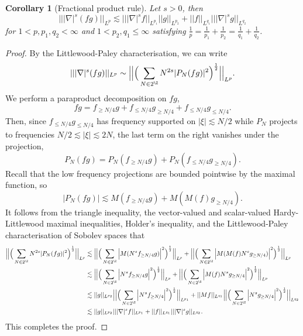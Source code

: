 \documentclass[reqno]{amsart}
\newtheorem{corollary}[theorem]{Corollary}
\theoremstyle{definition}
\theoremstyle{remark}
\begin{document}
\begin{corollary}[Fractional product rule]
	Let $s > 0$, then 
		\[ |||\nabla|^s (fg) ||_{L^p} \lesssim |||\nabla|^s f||_{L^{p_1}} ||g||_{L^{p_2}} + ||f||_{L^{q_1}} |||\nabla|^s g||_{L^{q_2}} \]
	for $1 < p, p_1, q_2 < \infty$ and $1 < p_2, q_1 \leq \infty$ satisfying $\tfrac1p = \tfrac{1}{p_1} + \tfrac{1}{p_2} = \tfrac{1}{q_1} + \tfrac{1}{q_2}$. 	
\end{corollary}

\begin{proof}
	By the Littlewood-Paley characterisation, we can write
		\[ || |\nabla|^s (f g) ||_{L^p} \sim \Big| \Big| \Big( \sum_{N \in 2^\Z} N^{2s} |P_N (f g)|^2 \Big)^\frac12 \Big| \Big|_{L^p}. \]
	We perform a paraproduct decomposition on $fg$, 
		\[ fg = f_{\geq N/4} g + f_{\leq N/4} g_{\geq N/4} + f_{\leq N/4} g_{\leq N/4}. \]
	Then, since $f_{\leq N/4} g_{\leq N/4}$ has frequency supported on $|\xi| \lesssim N/2$ while $P_N$ projects to frequencies $N/2 \lesssim |\xi| \lesssim 2N$, the last term on the right vanishes under the projection, 
		\[ P_N (f g) =  P_N (f_{\geq N/4} g) +P_N( f_{\leq N/4} g_{\geq N/4}) .  \]
	Recall that the low frequency projections are bounded pointwise by the maximal function, so 
		\[ |P_N (fg)| \lesssim M(f_{\geq N/4} g) + M(M(f) g_{\geq N/4}). \]
	It follows from the triangle inequality, the vector-valued and scalar-valued Hardy-Littlewood maximal inequalities, Holder's inequality, and the Littlewood-Paley characterisation of Sobolev spaces that
		\begin{align*}
			\Big|\Big| \Big( \sum_{N \in 2^\Z} N^{2s} |P_N (fg)|^2\Big)^\frac12 \Big|\Big|_{L^p} 
				&\lesssim \Big| \Big| \Big( \sum_{N \in 2^\Z} \Big| M(N^s f_{\geq N/4} g) \Big|^2 \Big)^\frac12 \Big| \Big|_{L^p} +  \Big| \Big| \Big( \sum_{N \in 2^\Z} \Big| M(M(f) N^s g_{\geq N/4}) \Big|^2 \Big)^\frac12 \Big| \Big|_{L^p} \\
				&\lesssim \Big| \Big| \Big( \sum_{N \in 2^\Z} \Big| N^s f_{\geq N/4} g \Big|^2 \Big)^\frac12 \Big| \Big|_{L^p} +  \Big| \Big| \Big( \sum_{N \in 2^\Z} \Big| M(f) N^s g_{\geq N/4} \Big|^2 \Big)^\frac12 \Big| \Big|_{L^p} \\
				&\lesssim ||g||_{L^{p_2}} \Big| \Big| \Big( \sum_{N \in 2^\Z} \Big| N^s f_{\geq N/4} \Big|^2 \Big)^\frac12 \Big| \Big|_{L^{p_1}} +  ||Mf ||_{L^{q_1}}\Big| \Big| \Big( \sum_{N \in 2^\Z} \Big| N^s g_{\geq N/4} \Big|^2 \Big)^\frac12 \Big| \Big|_{L^{q_2}} \\
				&\lesssim ||g||_{L^{p_2}} || |\nabla|^s f||_{L^{p_1}} + ||f||_{L^{q_1}} |||\nabla|^s g||_{L^{q_2}}.
		\end{align*}			
	This completes the proof. 	
\end{proof}
\end{document}
